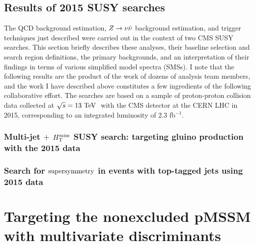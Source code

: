 \section{Results of 2015 SUSY searches}
\label{sec:2015results}
The QCD background estimation, $Z\rightarrow \nu\bar{\nu}$ background estimation, and trigger techniques just described were carried out in the context of two CMS SUSY searches. This section briefly describes these analyses, their baseline selection and search region definitions, the primary backgrounds, and an interpretation of their findings in terms of various simplified model spectra (SMSs). I note that the following results are the product of the work of dozens of analysis team members, and the work I have described above constitutes a few ingredients of the following collaborative effort. The searches are based on a sample of proton-proton collision data collected at $\sqrt{s}=13~\text{TeV}~$ with the CMS detector at the CERN LHC in 2015, corresponding to an integrated luminosity of 2.3 fb$^{-1}$.

\subsection{Multi-jet $+$ $H_{\text{T}}^{\rm miss}$ SUSY search: targeting gluino production with the 2015 data}
\label{sec:ra2b2015}

\FloatBarrier

\subsection{Search for $\text{supersymmetry}$ in events with top-tagged jets using 2015 data}
\label{sec:hadstop2015}

\FloatBarrier

\chapter{Targeting the nonexcluded pMSSM with multivariate discriminants}
\label{sec:money}
\FloatBarrier
